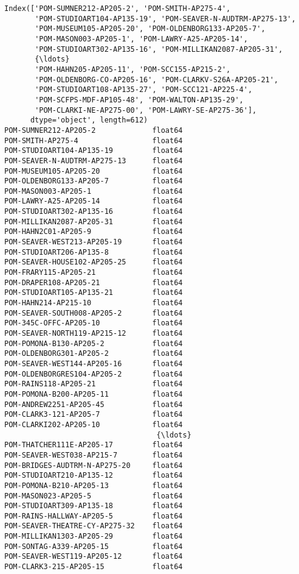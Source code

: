 \documentclass[11pt]{article}
\begin{document}
    \begin{Verbatim}[commandchars=\\\{\}]
Index(['POM-SUMNER212-AP205-2', 'POM-SMITH-AP275-4',
       'POM-STUDIOART104-AP135-19', 'POM-SEAVER-N-AUDTRM-AP275-13',
       'POM-MUSEUM105-AP205-20', 'POM-OLDENBORG133-AP205-7',
       'POM-MASON003-AP205-1', 'POM-LAWRY-A25-AP205-14',
       'POM-STUDIOART302-AP135-16', 'POM-MILLIKAN2087-AP205-31',
       {\ldots}
       'POM-HAHN205-AP205-11', 'POM-SCC155-AP215-2',
       'POM-OLDENBORG-CO-AP205-16', 'POM-CLARKV-S26A-AP205-21',
       'POM-STUDIOART108-AP135-27', 'POM-SCC121-AP225-4',
       'POM-SCFPS-MDF-AP105-48', 'POM-WALTON-AP135-29',
       'POM-CLARKI-NE-AP275-00', 'POM-LAWRY-SE-AP275-36'],
      dtype='object', length=612)
POM-SUMNER212-AP205-2             float64
POM-SMITH-AP275-4                 float64
POM-STUDIOART104-AP135-19         float64
POM-SEAVER-N-AUDTRM-AP275-13      float64
POM-MUSEUM105-AP205-20            float64
POM-OLDENBORG133-AP205-7          float64
POM-MASON003-AP205-1              float64
POM-LAWRY-A25-AP205-14            float64
POM-STUDIOART302-AP135-16         float64
POM-MILLIKAN2087-AP205-31         float64
POM-HAHN2C01-AP205-9              float64
POM-SEAVER-WEST213-AP205-19       float64
POM-STUDIOART206-AP135-8          float64
POM-SEAVER-HOUSE102-AP205-25      float64
POM-FRARY115-AP205-21             float64
POM-DRAPER108-AP205-21            float64
POM-STUDIOART105-AP135-21         float64
POM-HAHN214-AP215-10              float64
POM-SEAVER-SOUTH008-AP205-2       float64
POM-345C-OFFC-AP205-10            float64
POM-SEAVER-NORTH119-AP215-12      float64
POM-POMONA-B130-AP205-2           float64
POM-OLDENBORG301-AP205-2          float64
POM-SEAVER-WEST144-AP205-16       float64
POM-OLDENBORGRES104-AP205-2       float64
POM-RAINS118-AP205-21             float64
POM-POMONA-B200-AP205-11          float64
POM-ANDREW2251-AP205-45           float64
POM-CLARK3-121-AP205-7            float64
POM-CLARKI202-AP205-10            float64
                                   {\ldots}   
POM-THATCHER111E-AP205-17         float64
POM-SEAVER-WEST038-AP215-7        float64
POM-BRIDGES-AUDTRM-N-AP275-20     float64
POM-STUDIOART210-AP135-12         float64
POM-POMONA-B210-AP205-13          float64
POM-MASON023-AP205-5              float64
POM-STUDIOART309-AP135-18         float64
POM-RAINS-HALLWAY-AP205-5         float64
POM-SEAVER-THEATRE-CY-AP275-32    float64
POM-MILLIKAN1303-AP205-29         float64
POM-SONTAG-A339-AP205-15          float64
POM-SEAVER-WEST119-AP205-12       float64
POM-CLARK3-215-AP205-15           float64

\end{Verbatim}
\end{document}
